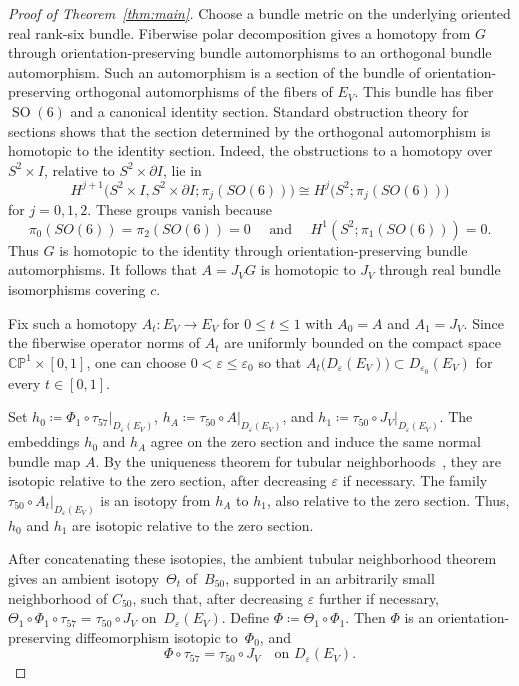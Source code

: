 \documentclass{amsart}
\numberwithin{equation}{section}
\theoremstyle{definition}
\newcommand{\CP}{\mathbb{CP}}
\newcommand{\wideand}{ \quad \text{ and } \quad }
\DeclareMathOperator{\SO}{SO}
\begin{document}
\begin{proof}[Proof of Theorem~\ref{thm:main}]
    Choose a bundle metric on the underlying oriented real rank-six bundle.
    Fiberwise polar decomposition gives a homotopy from $G$ through orientation-preserving bundle automorphisms to an orthogonal bundle automorphism. 
    Such an automorphism is a section of the bundle of orientation-preserving orthogonal automorphisms of the fibers of $E_V$. 
    This bundle has fiber~$\SO(6)$ and a canonical identity section.
    Standard obstruction theory for sections \cite[Part~III]{Steenrod1999book} shows that the section determined by the orthogonal automorphism is homotopic to the identity section. 
    Indeed, the obstructions to a homotopy over~$S^2\times I$, relative to $S^2\times\partial I$, lie in
    $$
        H^{j+1}\bigl(S^2\times I,S^2\times\partial I;\pi_j(SO(6))\bigr)\cong H^j\bigl(S^2;\pi_j(SO(6))\bigr)
    $$
    for $j=0,1,2$. 
    These groups vanish because
    $$
    \pi_0(SO(6))=\pi_2(SO(6))=0 \wideand H^1(S^2;\pi_1(SO(6)))=0.
    $$
    Thus $G$ is homotopic to the identity through orientation-preserving bundle automorphisms.
    It follows that $A=J_VG$ is homotopic to $J_V$ through real bundle isomorphisms covering $c$.

    Fix such a homotopy $A_t\colon E_V\to E_V$ for $0\leq t\leq 1$ with $A_0=A$ and $A_1=J_V$.
    Since the fiberwise operator norms of $A_t$ are uniformly bounded on the compact space $\CP^1\times[0,1]$, one can choose $0<\varepsilon\leq\varepsilon_0$ so that $A_t\bigl(D_\varepsilon(E_V)\bigr) \subset D_{\varepsilon_0}(E_V)$ for every $t\in[0,1]$.
    
    Set $h_0 \coloneq  \left.\Phi_1\circ\tau_{57}\right|_{D_\varepsilon(E_V)}$, $h_A \coloneq\left.\tau_{50}\circ A\right|_{D_\varepsilon(E_V)}$, and $h_1 \coloneq\left.\tau_{50}\circ J_V\right|_{D_\varepsilon(E_V)}$.
    The embeddings $h_0$ and $h_A$ agree on the zero section and induce the same normal bundle map $A$. 
    By the uniqueness theorem for tubular neighborhoods~\cite[Chapter~4, Theorem~5.3]{Hirsch1976book}, they are isotopic relative to the zero section, after decreasing $\varepsilon$ if necessary.
    The family $\tau_{50}\circ A_t|_{D_\varepsilon(E_V)}$ is an isotopy from $h_A$ to $h_1$, also relative to the zero section.
    Thus,$h_0$ and $h_1$ are isotopic relative to the zero section.

    After concatenating these isotopies, the ambient tubular neighborhood theorem~\cite[Chapter~8, Theorem~1.8]{Hirsch1976book} gives an ambient isotopy~$\Theta_t$ of~$B_{50}$, supported in an arbitrarily small neighborhood of $C_{50}$, such that, after decreasing $\varepsilon$ further if necessary, $\Theta_1\circ\Phi_1\circ\tau_{57}=\tau_{50}\circ J_V$ on~$D_\varepsilon(E_V)$.
    Define $\Phi \coloneq \Theta_1\circ\Phi_1$.
    Then $\Phi$ is an orientation-preserving diffeomorphism isotopic to~$\Phi_0$, and
    \begin{equation}\label{eq:J_V}
        \Phi\circ\tau_{57} =\tau_{50}\circ J_V \quad\text{on }D_\varepsilon(E_V).
    \end{equation}


\end{proof}
\end{document}
